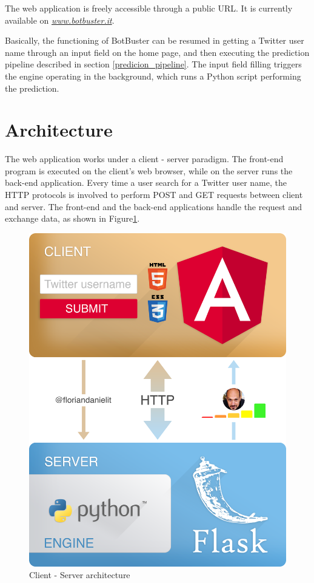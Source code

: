 The web application is freely accessible through a public URL. It is currently available on \href{http://www.botbuster.it}{\textit{www.botbuster.it}}.

Basically, the functioning of BotBuster can be resumed in getting a Twitter user name through an input field on the home page, and then executing the prediction pipeline described in section \ref{predicion_pipeline}.
The input field filling triggers the engine operating in the background, which runs a Python script performing the prediction.
\section{Architecture}
The web application works under a client - server paradigm. The front-end program is executed on the client's web browser, while on the server runs the back-end application.
Every time a user search for a Twitter user name, the HTTP protocols is involved to perform POST and GET requests between client and server. The front-end and the back-end applications handle the request and exchange data, as shown in Figure\ref{fig:architecture}.
\begin{figure}[t!]
	\begin{center}
		\includegraphics[width=0.6\columnwidth]{chapter7/figure/architecture.png} 
	\end{center}
	\caption{Client - Server architecture}
	\label{fig:architecture}
\end{figure}

